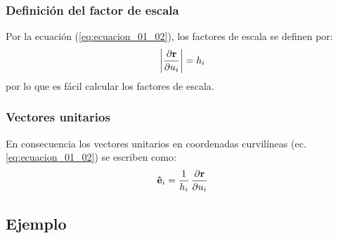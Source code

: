 \documentclass[12pt]{beamer}
\begin{document}
\begin{frame}
\frametitle{Definición del factor de escala}
Por la ecuación (\ref{eq:ecuacion_01_02}), los factores de escala se definen por:
\pause
\begin{align}
\abs{\pdv{\vb{r}}{u_{i}}} = h_{i}
\label{eq:ecuacion_01_04}
\end{align}
por lo que es fácil calcular los factores de escala.
\end{frame}
\begin{frame}
\frametitle{Vectores unitarios}
En consecuencia los vectores unitarios en coordenadas curvilíneas (ec. \ref{eq:ecuacion_01_02}) se escriben como:
\pause
\begin{align}
\vu{e}_{i} = \dfrac{1}{h_{i}} \, \pdv{\vb{r}}{u_{i}}
\label{eq:ecuacion_01_05}
\end{align}
\end{frame}

\subsection*{Ejemplo}
\end{document}
